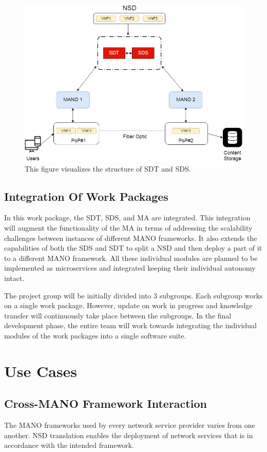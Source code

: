 \begin{figure}[h]
	\centering
	\includegraphics[width=0.7\linewidth]{figures/Structure1}
	\caption{This figure visualizes the structure of SDT and SDS. }
	\label{fig:structure1}
\end{figure}

\subsection{Integration Of Work Packages}
In this work package, the SDT, SDS, and MA are integrated. This integration will augment the functionality of the MA in terms of addressing the scalability challenges between instances of different MANO frameworks. It also extends the capabilities of both the SDS and SDT to split a NSD and then deploy a part of it to a different MANO framework. All these individual modules are planned to be implemented as microservices and integrated keeping their individual autonomy intact. 

The project group will be initially divided into 3 subgroups. Each subgroup works on a single work package. However, update on work in progress and knowledge transfer will continuously take place between the subgroups. In the final development phase, the entire team will work towards integrating the individual modules of the work packages into a single software suite.


\section{Use Cases}

\subsection{Cross-MANO Framework Interaction}
The MANO frameworks used by every network service provider varies from one another. NSD translation enables the deployment of network services that is in accordance with the intended framework.

